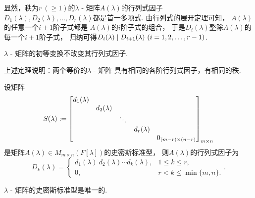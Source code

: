 显然，秩为\(r\ (\geq1)\)的\(\lambda\) - 矩阵\(A(\lambda)\)的行列式因子
\(D_1(\lambda),D_2(\lambda),\dotsc,D_r(\lambda)\)都是首一多项式.
由{行列式的展开定理}可知，
\(A(\lambda)\)的任意一个\(i+1\)阶子式都是
\(A(\lambda)\)的\(i\)阶子式的组合，
于是\(D_i(\lambda)\)整除\(A(\lambda)\)的每一个\(i+1\)阶子式，
归纳可得\(
	\ExactlyDividedBy{ D_{i+1}(\lambda) }{ D_i(\lambda) }
	\ (i=1,2,\dotsc,r-1)
\).

\begin{theorem}
\(\lambda\) - 矩阵的初等变换不改变其行列式因子.
\end{theorem}
\begin{remark}
上述定理说明：两个等价的\(\lambda\) - 矩阵
具有相同的各阶行列式因子，有相同的秩.
\end{remark}

\begin{proposition}
设矩阵\begin{equation*}
	S(\lambda)
	\defeq
	\begin{bmatrix}
		d_1(\lambda) \\
		& d_2(\lambda) \\
		&& \ddots \\
		&&& d_r(\lambda) \\
		&&&& 0_{(m-r) \times (n-r)} \\
	\end{bmatrix}_{m \times n}
\end{equation*}
是矩阵\(A(\lambda) \in M_{m \times n}(F[\lambda])\)的史密斯标准型，
则\(A(\lambda)\)的行列式因子为\begin{equation}
	D_k(\lambda)
	= \begin{cases}
		d_1(\lambda) ~ d_2(\lambda) \dotsm d_k(\lambda),
		& 1 \leq k \leq r, \\
		0,
		& r < k \leq \min\{m,n\}.
	\end{cases}.
\end{equation}
\end{proposition}

\begin{theorem}
\(\lambda\) - 矩阵的史密斯标准型是唯一的.
\end{theorem}

